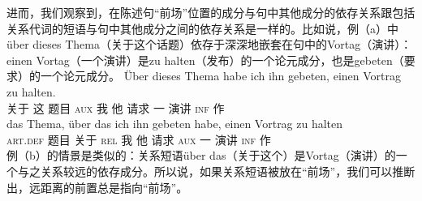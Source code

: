 进而，我们观察到，在陈述句“前场”位置的成分与句中其他成分的依存关系跟包括关系代词的短语与句中其他成分之间的依存关系是一样的。比如说，例（a）中über dieses Thema（关于这个话题）依存于深深地嵌套在句中的Vortag（演讲）：einen Vortag（一个演讲）是zu halten（发布）的一个论元成分，也是gebeten（要求）的一个论元成分。
\eal
\ex 
\gll Über dieses Thema habe ich ihn gebeten, einen Vortrag zu halten.\\
      关于 这 题目  \textsc{aux} 我   他 请求    一     演讲   \textsc{inf} 作\\
\ex 
\gll das Thema, über das ich ihn gebeten habe, einen Vortrag zu halten\\
     \textsc{art}.\textsc{def} 题目  关于  \textsc{rel} 我 他 请求  \textsc{aux} 一 演讲 \textsc{inf} 作\\
\zl
例（b）的情景是类似的：关系短语über das（关于这个）是Vortag（演讲）的一个与之关系较远的依存成分。所以说，如果关系短语被放在“前场”，我们可以推断出，远距离的前置总是指向“前场”。

